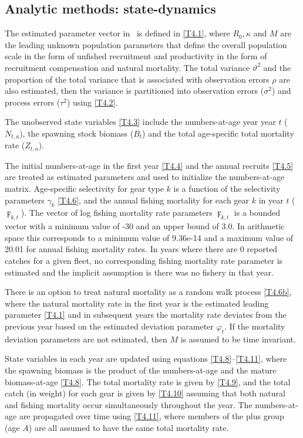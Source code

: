 \subsection{Analytic methods: state-dynamics} %
\label{sub:analytic_methods_state_dynamics}


\begin{multicols}{2}
The estimated parameter vector in \iscam\ is defined in \eqref{T4.1}, where $R_0, \kappa$ and $M$ are the leading unknown population parameters that define the overall population scale in the form of unfished recruitment and productivity in the form of recruitment compensation and natural mortality.  The total variance $\vartheta^2$ and the proportion of the total variance that is associated with observation errors $\rho$ are also estimated, then the variance is partitioned into observation errors ($\sigma^2$) and process errors ($\tau^2$) using \eqref{T4.2}.

The unobserved state variables \eqref{T4.3} include the numbers-at-age year year $t$ ($N_{t,a}$), the spawning stock biomass ($B_t$) and the total age-specific total mortality rate ($Z_{t,a}$).

The initial numbers-at-age in the first year \eqref{T4.4} and the annual recruits \eqref{T4.5} are treated as estimated parameters and used to initialize the numbers-at-age matrix.  Age-specific selectivity for gear type $k$ is a function of the selectivity parameters $\gamma_k$ \eqref{T4.6}, and the annual fishing mortality for each gear $k$ in year $t$ ($\digamma_{k,t}$).  The vector of log fishing mortality rate parameters $\digamma_{k,t}$ is a bounded vector with a minimum value of -30 and an upper bound of 3.0.  In arithmetic space this corresponds to a minimum value of 9.36e-14 and a maximum value of 20.01 for annual fishing mortality rates.  In years where there are 0 reported catches for a given fleet, no corresponding fishing mortality rate parameter is estimated and the implicit assumption is there was no fishery in that year.

There is an option to treat natural mortality as a random walk process \eqref{T4.6b}, where the natural mortality rate in the first year is the estimated leading parameter \eqref{T4.1} and in subsequent years the mortality rate deviates from the previous year based on the estimated deviation parameter $\varphi_t$.  If the mortality deviation parameters are not estimated, then $M$ is assumed to be time invariant.

State variables in each year are updated using equations \ref{T4.8}--\ref{T4.11}, where the spawning biomass is the product of the numbers-at-age and the mature biomass-at-age \eqref{T4.8}.  The total mortality rate is given by \eqref{T4.9}, and the total catch (in weight) for each gear is given by \eqref{T4.10} assuming that both natural and fishing mortality occur simultaneously throughout the year.  The numbers-at-age are propagated over time using \eqref{T4.11}, where members of the plus group (age $A$) are all assumed to have the same total mortality rate.  


\end{multicols}
